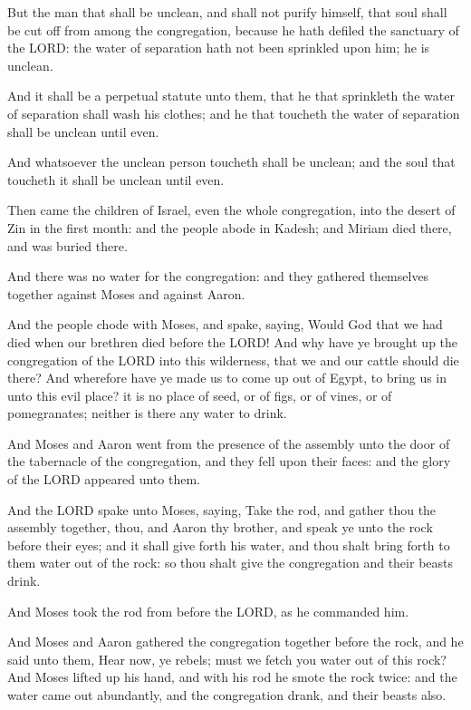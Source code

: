 \Verse But the man that shall be unclean, and shall not purify himself,
that soul shall be cut off from among the congregation, because he
hath defiled the sanctuary of the LORD: the water of separation hath
not been sprinkled upon him; he is unclean.

\Verse And it shall be a perpetual statute unto them, that he that
sprinkleth the water of separation shall wash his clothes; and he that
toucheth the water of separation shall be unclean until even.

\Verse And whatsoever the unclean person toucheth shall be unclean; and
the soul that toucheth it shall be unclean until even.


\Chapter
\Verse Then came the children of Israel, even the whole congregation,
into the desert of Zin in the first month: and the people abode in
Kadesh; and Miriam died there, and was buried there.

\Verse And there was no water for the congregation: and they gathered
themselves together against Moses and against Aaron.

\Verse And the people chode with Moses, and spake, saying, Would God
that we had died when our brethren died before the LORD!  \Verse And why
have ye brought up the congregation of the LORD into this wilderness,
that we and our cattle should die there?  \Verse And wherefore have ye
made us to come up out of Egypt, to bring us in unto this evil place?
it is no place of seed, or of figs, or of vines, or of pomegranates;
neither is there any water to drink.

\Verse And Moses and Aaron went from the presence of the assembly unto
the door of the tabernacle of the congregation, and they fell upon
their faces: and the glory of the LORD appeared unto them.

\Verse And the LORD spake unto Moses, saying, \Verse Take the rod, and
gather thou the assembly together, thou, and Aaron thy brother, and
speak ye unto the rock before their eyes; and it shall give forth his
water, and thou shalt bring forth to them water out of the rock: so
thou shalt give the congregation and their beasts drink.

\Verse And Moses took the rod from before the LORD, as he commanded him.

\Verse And Moses and Aaron gathered the congregation together before
the rock, and he said unto them, Hear now, ye rebels; must we fetch
you water out of this rock?  \Verse And Moses lifted up his hand, and
with his rod he smote the rock twice: and the water came out
abundantly, and the congregation drank, and their beasts also.


